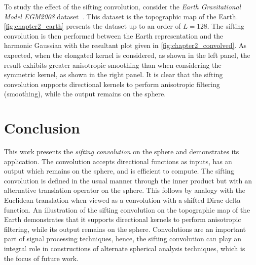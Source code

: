 To study the effect of the sifting convolution, consider the \emph{Earth Gravitational Model EGM2008} dataset~\cite{Pavlis2013}.
This dataset is the topographic map of the Earth.
\cref{fig:chapter2_earth} presents the dataset up to an order of \(L=128\).
The sifting convolution is then performed between the Earth representation and the harmonic Gaussian with the resultant plot given in \cref{fig:chapter2_convolved}.
As expected, when the elongated kernel is considered, as shown in the left panel, the result exhibits greater anisotropic smoothing than when considering the symmetric kernel, as shown in the right panel.
It is clear that the sifting convolution supports directional kernels to perform anisotropic filtering (smoothing), while the output remains on the sphere.





\section{Conclusion}\label{sec:chapter2_conclusion}

This work presents the \emph{sifting convolution} on the sphere and demonstrates its application.
The convolution accepts directional functions as inputs, has an output which remains on the sphere, and is efficient to compute.
The sifting convolution is defined in the usual manner through the inner product but with an alternative translation operator on the sphere.
This follows by analogy with the Euclidean translation when viewed as a convolution with a shifted Dirac delta function.
An illustration of the sifting convolution on the topographic map of the Earth demonstrates that it supports directional kernels to perform anisotropic filtering, while its output remains on the sphere.
Convolutions are an important part of signal processing techniques, hence, the sifting convolution can play an integral role in constructions of alternate spherical analysis techniques, which is the focus of future work.
